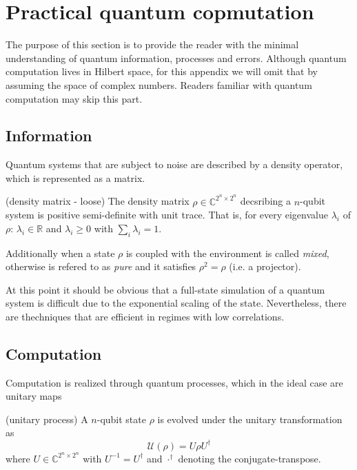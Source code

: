 \clearpage

\appendix
\section{Practical quantum copmutation}
The purpose of this section is to provide the reader with the minimal understanding of quantum information, processes and errors.
Although quantum computation lives in Hilbert space, for this appendix we will omit that by assuming the space of complex numbers.
Readers familiar with quantum computation may skip this part.

\subsection{Information}
Quantum systems that are subject to noise are described by a density operator, which is represented as a matrix.
\begin{definition} (density matrix - loose)
The density matrix $\rho\in\mathbb{C}^{2^n\times 2^n}$ decsribing a $n$-qubit system is positive semi-definite with unit trace.
That is, for every eigenvalue $\lambda_i$ of $\rho$: $\lambda_i\in\mathbb{R}$ and $\lambda_i\geq 0$ with $\sum_i \lambda_i=1.$
\end{definition}

\noindent Additionally when a state $\rho$ is coupled with the environment is called \textit{mixed}, otherwise is refered to as \textit{pure} and it satisfies $\rho^2=\rho$ (i.e. a projector).

At this point it should be obvious that a full-state simulation of a quantum system is difficult due to the exponential scaling of the state.
Nevertheless, there are thechniques that \cite{waintal2026competequantumcomputerslecture,PhysRevLett.128.220503} are efficient in regimes with low correlations.

\subsection{Computation}
\label{sec:computation}
Computation is realized through quantum processes, which in the ideal case are unitary maps

\begin{definition} (unitary process)
\label{def:unitary}
A $n$-qubit state $\rho$ is evolved under the unitary transformation as
\begin{equation}
    \mathcal{U}(\rho) = U\rho U^\dagger
\end{equation}
where $U\in\mathbb{C}^{2^n\times 2^n}$ with $U^{-1}=U^\dagger$ and $\cdot^\dagger$ denoting the conjugate-transpose.
\end{definition}

